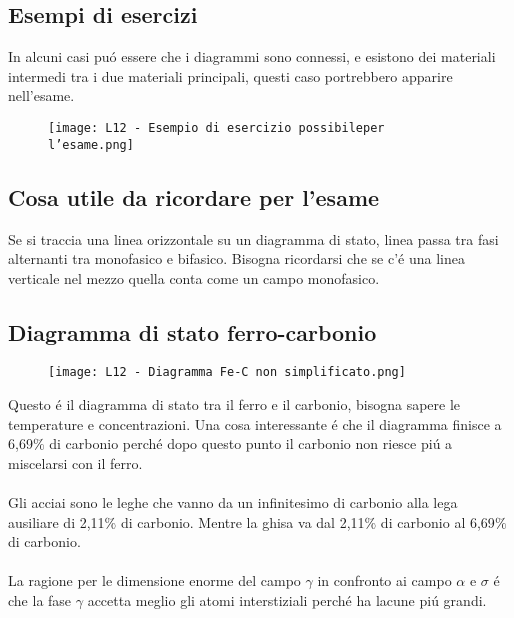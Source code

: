 \documentclass{article}
\begin{document}
{        \subsection{Esempi di esercizi}
            In alcuni casi pu\'o essere che i diagrammi sono connessi, e esistono dei materiali intermedi tra i due materiali principali, questi caso portrebbero apparire nell'esame.
            \begin{figure}[h!]
                \centering
                \texttt{[image: L12 - Esempio di esercizio possibileper l'esame.png]}
            \end{figure}
        \newpage
        \subsection{Cosa utile da ricordare per l'esame}
            Se si traccia una linea orizzontale su un diagramma di stato, linea passa tra fasi alternanti tra monofasico e bifasico. Bisogna ricordarsi che se c'\'e una linea verticale nel mezzo quella conta come un campo monofasico.
        \subsection{Diagramma di stato ferro-carbonio}
            \begin{figure}[h!]
                \centering
                \texttt{[image: L12 - Diagramma Fe-C non simplificato.png]}
            \end{figure}
            Questo \'e il diagramma di stato tra il ferro e il carbonio, bisogna sapere le temperature e concentrazioni. Una cosa interessante \'e che il diagramma finisce a 6,69$\%$ di carbonio perch\'e dopo questo punto il carbonio non riesce pi\'u a miscelarsi con il ferro.\\ \\
            Gli acciai sono le leghe che vanno da un infinitesimo di carbonio alla lega ausiliare di 2,11$\%$ di carbonio. Mentre la ghisa va dal 2,11$\%$ di carbonio al 6,69$\%$ di carbonio.\\ \\
            La ragione per le dimensione enorme del campo $\gamma$ in confronto ai campo $\alpha$ e $\sigma$ \'e che la fase $\gamma$ accetta meglio gli atomi interstiziali perch\'e ha lacune pi\'u grandi. 
}
\end{document}
